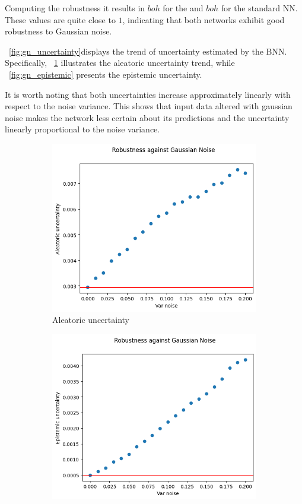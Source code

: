 Computing the robustness it results in $boh$ for the and $boh$ for the standard NN.  These values are quite close to $1$, indicating that both networks exhibit good robustness to Gaussian noise.

\Fig~\ref{fig:gn_uncertainty}displays the trend of uncertainty estimated by the BNN. Specifically, \Fig~\ref{fig:gn_aleatoric} illustrates the aleatoric uncertainty trend, while \Fig~\ref{fig:gn_epistemic} presents the epistemic uncertainty.

It is worth noting that both uncertainties increase approximately linearly with respect to the noise variance. This shows that input data altered with gaussian noise makes the network less certain about its predictions and the uncertainty linearly proportional to the noise variance.

\begin{figure}[h]
	\centering
	\begin{subfigure}{.5\textwidth}
		\centering
		\includegraphics[width=0.9\linewidth]{ImageFiles/EvalBNN/GN/aleatoric}
		\caption{Aleatoric uncertainty}
		\label{fig:gn_aleatoric}
	\end{subfigure}%
	\begin{subfigure}{.5\textwidth}
		\centering
		\includegraphics[width=0.9\linewidth]{ImageFiles/EvalBNN/GN/epistemic}

\end{subfigure}
\end{figure}
